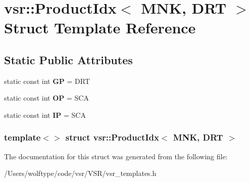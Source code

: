 \hypertarget{structvsr_1_1_product_idx_3_01_m_n_k_00_01_d_r_t_01_4}{\section{vsr\-:\-:Product\-Idx$<$ M\-N\-K, D\-R\-T $>$ Struct Template Reference}
\label{structvsr_1_1_product_idx_3_01_m_n_k_00_01_d_r_t_01_4}
}
\subsection*{Static Public Attributes}
\begin{DoxyCompactItemize}
\item 
\hypertarget{structvsr_1_1_product_idx_3_01_m_n_k_00_01_d_r_t_01_4_a42207fa304b5733ba6e21d9bdb39561e}{static const int {\bfseries G\-P} = D\-R\-T}\label{structvsr_1_1_product_idx_3_01_m_n_k_00_01_d_r_t_01_4_a42207fa304b5733ba6e21d9bdb39561e}

\item 
\hypertarget{structvsr_1_1_product_idx_3_01_m_n_k_00_01_d_r_t_01_4_a744fa515eaa17a443931ba396fdf1078}{static const int {\bfseries O\-P} = S\-C\-A}\label{structvsr_1_1_product_idx_3_01_m_n_k_00_01_d_r_t_01_4_a744fa515eaa17a443931ba396fdf1078}

\item 
\hypertarget{structvsr_1_1_product_idx_3_01_m_n_k_00_01_d_r_t_01_4_aafd0c85f7b9f69903625e6ebdacef19c}{static const int {\bfseries I\-P} = S\-C\-A}\label{structvsr_1_1_product_idx_3_01_m_n_k_00_01_d_r_t_01_4_aafd0c85f7b9f69903625e6ebdacef19c}

\end{DoxyCompactItemize}
\subsubsection*{template$<$$>$ struct vsr\-::\-Product\-Idx$<$ M\-N\-K, D\-R\-T $>$}



The documentation for this struct was generated from the following file\-:\begin{DoxyCompactItemize}
\item 
/\-Users/wolftype/code/vsr/\-V\-S\-R/vsr\-\_\-templates.\-h\end{DoxyCompactItemize}

